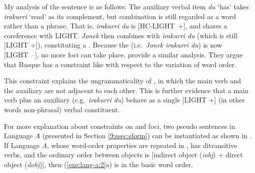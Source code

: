 My analysis of the sentence is as follows: The auxiliary verbal item
\textit{du} `has' takes \textit{irakurri} `read' as its complement,
but combination is still regarded as a word rather than a phrase. That
is, \textit{irakurri du} is \mbox{[HC-LIGHT +]}, and
shares a coreference with LIGHT.  \textit{Jonek} then combines with
\textit{irakurri du} (which is still [LIGHT +]), constituting a
. Because the 
(i.e.\ \textit{Jonek irakurri du}) is now \mbox{[LIGHT --]}, no more
 foci can take place.  \citet{crowgey:bender:11}
provide a similar analysis. They argue that Basque has a constraint
like  with respect to the variation of word order.



\noindent This constraint explains the ungrammaticality of
, in which the main verb and the auxiliary are
not adjacent to each other. This is further evidence
that a main verb plus an auxiliary (e.g.\ \textit{irakurri du}) behave
as a single [LIGHT +] (in other words non-phrasal) verbal constituent.




For more explanation about constraints on  and
 foci, two pseudo sentences in Language \textit{A}
(presented in Section \ref{9:ssec:sform}) can be instantiated as shown
in . If Language \textit{A}, whose word-order
properties are repeated in , has ditransitive
verbs, and the ordinary order between objects is [indirect object
  (\textit{iobj}) + direct object (\textit{dobj})], then
(\ref{exe:lang-a:2}a) is in the basic word order.


